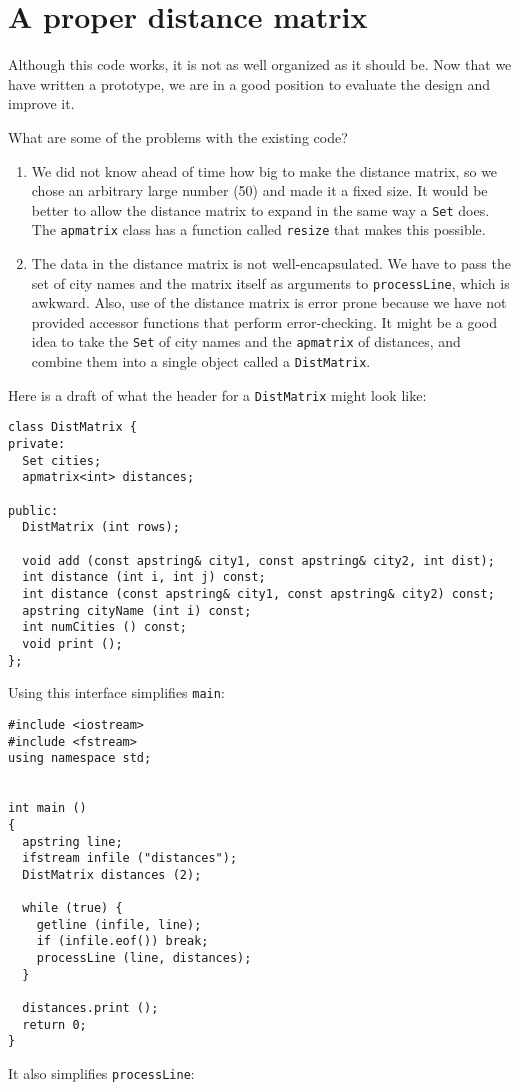 \section{A proper distance matrix}

Although this code works, it is not as well organized as it
should be.  Now that we have written a prototype, we are in a
good position to evaluate the design and improve it.

What are some of the problems with the existing code?

\begin{enumerate}

\item We did not know ahead of time how big to make the distance
matrix, so we chose an arbitrary large number (50) and made it
a fixed size.  It would be better to allow the distance matrix
to expand in the same way a {\tt Set} does.  The {\tt apmatrix}
class has a function called {\tt resize} that makes this possible.


\item The data in the distance matrix is not well-encapsulated.
We have to pass the set of city names and the matrix itself
as arguments to {\tt processLine}, which is awkward.  Also,
use of the distance matrix is error prone because we have not
provided accessor functions that perform error-checking.
It might be a good idea to take the {\tt Set} of city names
and the {\tt apmatrix} of distances, and combine them into a
single object called a {\tt DistMatrix}.

\end{enumerate}

Here is a draft of what the header for a {\tt DistMatrix}
might look like:

\begin{verbatim}
class DistMatrix {
private:
  Set cities;
  apmatrix<int> distances;

public:
  DistMatrix (int rows);

  void add (const apstring& city1, const apstring& city2, int dist);
  int distance (int i, int j) const;
  int distance (const apstring& city1, const apstring& city2) const;
  apstring cityName (int i) const;
  int numCities () const;
  void print ();
};
\end{verbatim}
%
Using this interface simplifies {\tt main}:

\begin{verbatim}
#include <iostream>
#include <fstream>
using namespace std;


int main ()
{
  apstring line;
  ifstream infile ("distances");
  DistMatrix distances (2);

  while (true) {
    getline (infile, line);
    if (infile.eof()) break;
    processLine (line, distances);
  }

  distances.print ();
  return 0;
}
\end{verbatim}
%
It also simplifies {\tt processLine}:

